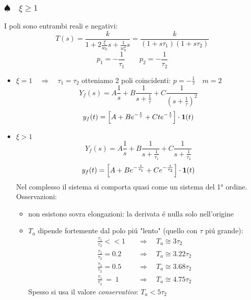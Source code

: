 \documentclass[../main.tex]{subfiles}
\begin{document}
	\subsubsection{$ \spadesuit \quad \xi \geq 1 $}
		I poli sono entrambi reali e negativi:
		\[ 
			T(s) = \frac{k}{1+2\frac{\xi}{w_0}s+\frac{1}{w_0^2}s} = \frac{k}{(1+s\tau_1)(1+s\tau_2)}
		\]
		\[ 
			p_1 = -\frac{1}{\tau_1} \qquad p_2 = -\frac{1}{\tau_2}
		\]
		\begin{itemize}
			\item 
				$ \xi = 1 \quad \Rightarrow \quad \tau_1 = \tau_2 $
				otteniamo 2 poli coincidenti: $ p = -\frac{1}{\tau} \quad m = 2 $
				\[ 
					Y_f(s) = A\frac{1}{s} + B\frac{1}{s+\frac{1}{\tau}} + C\frac{1}{(s+\frac{1}{\tau})^2} 
				\]
				\[ 
					y_f(t) = \left[ A + Be^{-\frac{t}{\tau}} + C t e^{-\frac{t}{\tau}} \right] \cdot \textbf{1}(t)
				\]
			\item 
				$ \xi > 1 $
				\[ 
					Y_f(s) = A\frac{1}{s} + B\frac{1}{s+\frac{1}{\tau_1}} + C\frac{1}{s+\frac{1}{\tau_2}} 
				\]
				\[ 
					y_f(t) = \left[ A + Be^{-\frac{t}{\tau_1}} + Ce^{-\frac{t}{\tau_2}} \right] \cdot \textbf{1}(t) 
				\]
				Nel complesso il sistema si comporta quasi come un sistema del 1° ordine.\\
				Osservazioni:
				\begin{itemize}
					\item 
						non esistono sovra elongazioni: la derivata \'e nulla solo nell'origine
					\item 
						$ T_a $ dipende fortemente dal polo pi\'u "lento" (quello con $ \tau $ pi\'u grande):
						\begin{align*}
							\frac{\tau_1}{\tau_2} << 1 \quad &\Rightarrow \quad T_a \cong 3 \tau_2
							\\
							\frac{\tau_1}{\tau_2} = 0.2 \quad &\Rightarrow \quad T_a \cong 3.22 \tau_2
							\\
							\frac{\tau_1}{\tau_2} = 0.5 \quad &\Rightarrow \quad T_a \cong 3.68 \tau_2
							\\
							\frac{\tau_1}{\tau_2}\ =\ 1 \quad &\Rightarrow \quad T_a \cong 4.75 \tau_2
						\end{align*}
						Spesso si usa il valore \textit{conservativo}: $ T_a < 5 \tau_2 $
				\end{itemize}
		\end{itemize}
\end{document}
